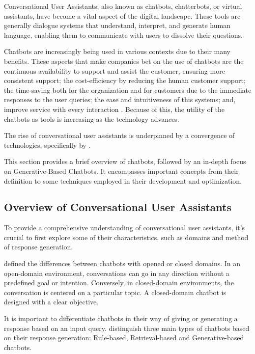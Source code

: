 Conversational User Assistants, also known as chatbots, chatterbots, or virtual assistants, have become a vital aspect of the digital landscape. These tools are generally dialogue systems that understand, interpret, and generate human language, enabling them to communicate with users to dissolve their questions.

Chatbots are increasingly being used in various contexts due to their many benefits. These aspects that make companies bet on the use of chatbots are the continuous availability to support and assist the customer, ensuring more consistent support; the cost-efficiency by reducing the human customer support; the time-saving both for the organization and for customers due to the immediate responses to the user queries; the ease and intuitiveness of this systems; and, improve service with every interaction \cite{misischia_chatbots_2022}. Because of this, the utility of the chatbots as tools is increasing as the technology advances. 

The rise of conversational user assistants is underpinned by a convergence of technologies, specifically by {\llm}.

This section provides a brief overview of chatbots, followed by an in-depth focus on Generative-Based Chatbots. It encompasses important concepts from their definition to some techniques employed in their development and optimization.


\subsection{Overview of Conversational User Assistants}

To provide a comprehensive understanding of conversational user assistants, it's crucial to first explore some of their characteristics, such as domains and method of response generation.

\citet{nuruzzaman_survey_2018} defined the differences between chatbots with opened or closed domains. In an open-domain environment, conversations can go in any direction without a predefined goal or intention. Conversely, in closed-domain environments, the conversation is centered on a particular topic. A closed-domain chatbot is designed with a clear objective.

It is important to differentiate chatbots in their way of giving or generating a response based on an input query. \citet{peng_survey_2019} distinguish three main types of chatbots based on their response generation: Rule-based, Retrieval-based and Generative-based chatbots.

